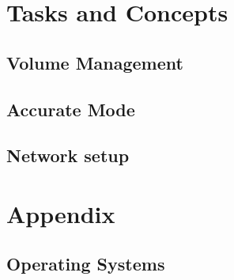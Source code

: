 \documentclass[10pt,a4paper]{book}
\begin{document}
\part{Tasks and Concepts}





\chapter{Volume Management}
  
  









\chapter{Accurate Mode}
    







\chapter{Network setup}








\appendix
\part{Appendix}



\chapter{Operating Systems}
\label{SupportedOSes}

    

%
%
\end{document}
